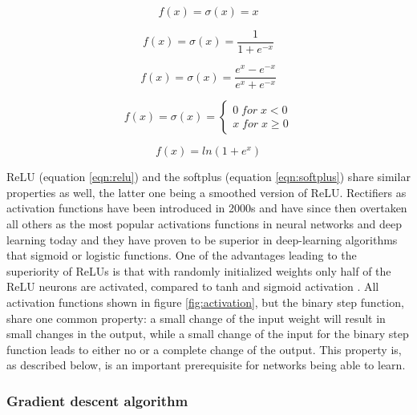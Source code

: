 \begin{equation}
 f(x) = \sigma(x) = x
 \label{eqn:ident}
\end{equation}
       
\begin{equation}
 f(x) = \sigma(x) = \frac{1}{1+e^{-x}} 
 \label{eqn:sigmoid}
\end{equation}

\begin{equation}
 f(x) = \sigma(x) = \frac{e^x - e^{-x}}{e^x + e^{-x}}
 \label{eqn:tanh}
\end{equation}

\begin{equation}
  f(x)= \sigma(x) = \left\{
 \begin{array}{ll}
  0 \; for \; x < 0 \\ 
  x \; for \; x \geq 0
 \end{array}
\right .
\label{eqn:relu}
\end{equation}

\begin{equation}
  f(x) = ln(1+e^x)
 \label{eqn:softplus}
\end{equation}

ReLU (equation \ref{eqn:relu}) and the softplus (equation \ref{eqn:softplus}) share similar properties as
well, the latter one being a smoothed version of ReLU. Rectifiers as activation functions have been introduced
in 2000s \cite{hahnloser2000digital} and have since then overtaken all others as the most popular activations
functions in neural networks and deep learning today \cite{lecun2015deep} and they have proven to be superior
in deep-learning algorithms that sigmoid or logistic functions. One of the advantages leading to the
superiority of ReLUs is that with randomly initialized weights only half of the ReLU neurons are activated,
compared to tanh and sigmoid activation \cite{glorot2011deep}. All activation functions shown in figure
\ref{fig:activation}, but the binary step function, share one common property: a small change of the input
weight will result in small changes in the output, while a small change of the input for the binary step
function leads to either no or a complete change of the output. This property is, as described below, is an
important prerequisite for networks being able to learn. \\

\subsubsection{Gradient descent algorithm}

